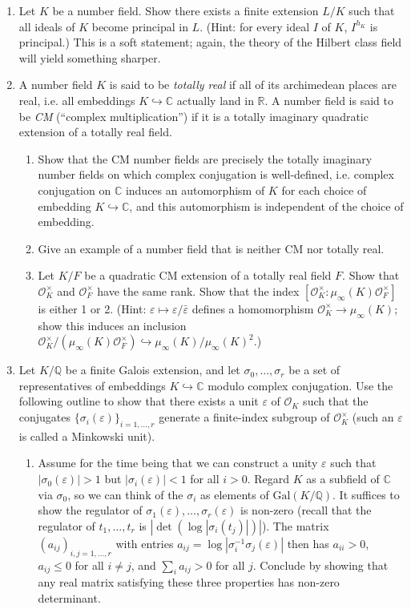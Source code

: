\documentclass[11pt,answers,addpoints,reqno]{exam}
\theoremstyle{definition}
\theoremstyle{remark}
\theoremstyle{definition}
\theoremstyle{remark}
\theoremstyle{remark}
\theoremstyle{remark}
\newcommand{\Q}{\mathbb{Q}}
\newcommand{\CC}{\mathbb{C}}
\newcommand{\RR}{\mathbb{R}}
\newcommand{\Gal}{\mathrm{Gal}} %
\newcommand{\into}{\hookrightarrow}
\newcommand{\mc}{\mathcal}
\begin{document}
\begin{enumerate}
\begin{enumerate}
\end{enumerate}
\item Let $K$ be a number field. Show there exists a finite extension $L/K$ such that all ideals of $K$ become principal in $L$. (Hint: for every ideal $I$ of $K$, $I^{h_K}$ is principal.) This is a soft statement; again, the theory of the Hilbert class field will yield something sharper.
\item A number field $K$ is said to be \textit{totally real} if all of its archimedean places are real, i.e. all embeddings $K \into \CC$ actually land in $\RR$. A number field is said to be \textit{CM} (``complex multiplication'') if it is a totally imaginary quadratic extension of a totally real field. 
\begin{enumerate}
\item Show that the CM number fields are precisely the totally imaginary number fields on which complex conjugation is well-defined, i.e. complex conjugation on $\CC$ induces an automorphism of $K$ for each choice of embedding $K \into \CC$, and this automorphism is independent of the choice of embedding.
\item Give an example of a number field that is neither CM nor totally real.
\item Let $K/F$ be a quadratic CM extension of a totally real field $F$. Show that $\mc{O}_K^\times$ and $\mc{O}_F^\times$ have the same rank. Show that the index $[\mc{O}_K^\times: \mu_{\infty}(K) \mc{O}_F^\times]$ is either 1 or 2. (Hint: $\varepsilon \mapsto \varepsilon/\bar{\varepsilon}$ defines a homomorphism $\mc{O}_K^\times \to \mu_{\infty}(K)$; show this induces an inclusion $\mc{O}_K^\times/(\mu_{\infty}(K) \mc{O}_F^\times) \into \mu_{\infty}(K)/\mu_{\infty}(K)^2$.)
\end{enumerate}
\item Let $K/\Q$ be a finite Galois extension, and let $\sigma_0, \ldots, \sigma_{r}$ be a set of representatives of embeddings $K \into \CC$ modulo complex conjugation. Use the following outline to show that there exists a unit $\varepsilon$ of $\mc{O}_K$ such that the conjugates $\{\sigma_i(\varepsilon)\}_{i=1, \ldots, r}$ generate a finite-index subgroup of $\mc{O}_K^{\times}$ (such an $\varepsilon$ is called a Minkowski unit).
\begin{enumerate}
\item Assume for the time being that we can construct a unity $\varepsilon$ such that $|\sigma_0(\varepsilon)|>1$ but $|\sigma_i(\varepsilon)|<1$ for all $i>0$. Regard $K$ as a subfield of $\CC$ via $\sigma_0$, so we can think of the $\sigma_i$ as elements of $\Gal(K/\Q)$. It suffices to show the regulator of $\sigma_1(\varepsilon), \ldots, \sigma_r(\varepsilon)$ is non-zero (recall that the regulator of $t_1, \ldots, t_r$ is $|\det(\log|\sigma_i(t_j)|)|$). The matrix $(a_{ij})_{i, j=1, \ldots, r}$ with entries $a_{ij}= \log|\sigma_i^{-1}\sigma_j(\varepsilon)|$ then has $a_{ii}>0$, $a_{ij}\leq0$ for all $i \neq j$, and $\sum_i a_{ij} >0$ for all $j$. Conclude by showing that any real matrix satisfying these three properties has non-zero determinant.

\end{enumerate}
\end{enumerate}
\end{document}
